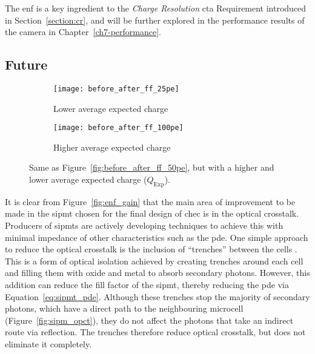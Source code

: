 The \gls{enf} is a key ingredient to the \textit{Charge Resolution} \gls{cta} Requirement introduced in Section~\ref{section:cr}, and will be further explored in the performance results of the camera in Chapter~\ref{ch7-performance}.

\subsection{Future} \label{section:sipmt_future}

\begin{figure}
  \begin{subfigure}[b]{0.49\textwidth}
    \texttt{[image: before\_after\_ff\_25pe]}
    \caption{Lower average expected charge}
    \label{fig:before_after_ff_25pe}
  \end{subfigure}
  \hfill
  \begin{subfigure}[b]{0.49\textwidth}
    \texttt{[image: before\_after\_ff\_100pe]}
    \caption{Higher average expected charge}
    \label{fig:before_after_ff_100pe}
  \end{subfigure}
  \caption[Flat-field residuals at other illuminations.]{Same as Figure~\ref{fig:before_after_ff_50pe}, but with a higher and lower average expected charge ($Q_\text{Exp}$).}
\end{figure}

It is clear from Figure~\ref{fig:enf_gain} that the main area of improvement to be made in the \gls{sipmt} chosen for the final design of \gls{chec} is in the optical crosstalk. Producers of \glspl{sipmt} are actively developing techniques to achieve this with minimal impedance of other characteristics such as the \gls{pde}. One simple approach to reduce the optical crosstalk is the inclusion of ``trenches'' between the cells \cite{Kindt1998,Pagano2011}. This is a form of optical isolation achieved by creating trenches around each cell and filling them with oxide and metal to absorb secondary photons. However, this addition can reduce the fill factor of the \gls{sipmt}, thereby reducing the \gls{pde} via Equation~\ref{eq:sipmt_pde}. Although these trenches stop the majority of secondary photons, which have a direct path to the neighbouring microcell (Figure~\ref{fig:sipm_opct}), they do not affect the photons that take an indirect route via reflection. The trenches therefore reduce optical crosstalk, but does not eliminate it completely.


